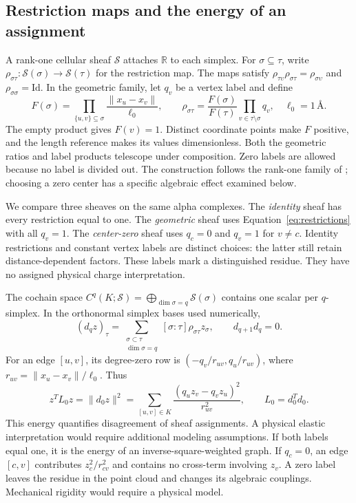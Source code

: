 \documentclass[11pt]{article}
\newcommand{\R}{\mathbb{R}}
\newcommand{\angstrom}{\text{\AA}}
\newcommand{\Id}{\mathrm{Id}}
\begin{document}
\subsection{Restriction maps and the energy of an assignment}
A rank-one cellular sheaf $\mathcal S$ attaches $\R$ to each simplex. For $\sigma\subseteq\tau$, write $\rho_{\sigma\tau}:\mathcal S(\sigma)\to\mathcal S(\tau)$ for the restriction map. The maps satisfy $\rho_{\tau\upsilon}\rho_{\sigma\tau}=\rho_{\sigma\upsilon}$ and $\rho_{\sigma\sigma}=\Id$. In the geometric family, let $q_v$ be a vertex label and define
\begin{equation}
F(\sigma)=\prod_{\{u,v\}\subseteq\sigma}\frac{\|x_u-x_v\|}{\ell_0},\qquad
\rho_{\sigma\tau}=\frac{F(\sigma)}{F(\tau)}\prod_{v\in\tau\setminus\sigma}q_v,
\quad \ell_0=1\,\angstrom.
\label{eq:restrictions}
\end{equation}
The empty product gives $F(v)=1$. Distinct coordinate points make $F$ positive, and the length reference makes its values dimensionless. Both the geometric ratios and label products telescope under composition. Zero labels are allowed because no label is divided out. The construction follows the rank-one family of \citet{wei2025}; choosing a zero center has a specific algebraic effect examined below.

We compare three sheaves on the same alpha complexes. The \emph{identity} sheaf has every restriction equal to one. The \emph{geometric} sheaf uses Equation~\eqref{eq:restrictions} with all $q_v=1$. The \emph{center-zero} sheaf uses $q_c=0$ and $q_v=1$ for $v\ne c$. Identity restrictions and constant vertex labels are distinct choices: the latter still retain distance-dependent factors. These labels mark a distinguished residue. They have no assigned physical charge interpretation.

The cochain space $C^q(K;\mathcal S)=\bigoplus_{\dim\sigma=q}\mathcal S(\sigma)$ contains one scalar per $q$-simplex. In the orthonormal simplex bases used numerically,
\begin{equation}
(d_q z)_\tau=\sum_{\substack{\sigma\subset\tau\\\dim\sigma=q}}[\sigma:\tau]\rho_{\sigma\tau}z_\sigma,
\qquad d_{q+1}d_q=0.
\label{eq:coboundary}
\end{equation}
For an edge $[u,v]$, its degree-zero row is $(-q_v/r_{uv},q_u/r_{uv})$, where $r_{uv}=\|x_u-x_v\|/\ell_0$. Thus
\begin{equation}
z^T L_0 z=\|d_0z\|^2
=\sum_{[u,v]\in K}\frac{(q_u z_v-q_v z_u)^2}{r_{uv}^2},
\qquad L_0=d_0^T d_0.
\label{eq:energy}
\end{equation}
This energy quantifies disagreement of sheaf assignments. A physical elastic interpretation would require additional modeling assumptions. If both labels equal one, it is the energy of an inverse-square-weighted graph. If $q_c=0$, an edge $[c,v]$ contributes $z_c^2/r_{cv}^2$ and contains no cross-term involving $z_v$. A zero label leaves the residue in the point cloud and changes its algebraic couplings. Mechanical rigidity would require a physical model.
\end{document}
